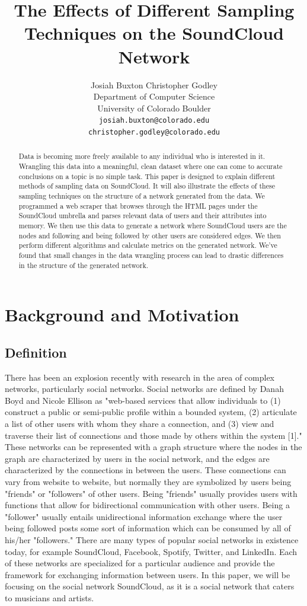 \documentclass{article}
\title{The Effects of Different Sampling Techniques on the SoundCloud Network}
\author{
	Josiah Buxton \hspace{45pt} Christopher Godley\\
	Department of Computer Science\\
	University of Colorado Boulder\\
	\texttt{josiah.buxton@colorado.edu} \\
	\texttt{christopher.godley@colorado.edu} \\
}
\begin{document}
	
\graphicspath{ {c:/users/jbuxofplenty/Github/soundcloud_crawler/final_report/} }

\maketitle

\begin{abstract}
  Data is becoming more freely available to any individual who is interested in it.  Wrangling this data into a meaningful, clean dataset where one can come to accurate conclusions on a topic is no simple task.  This paper is designed to explain different methods of sampling data on SoundCloud.  It will also illustrate the effects of these sampling techniques on the structure of a network generated from the data.  We programmed a web scraper that browses through the HTML pages under the SoundCloud umbrella and parses relevant data of users and their attributes into memory.  We then use this data to generate a network where SoundCloud users are the nodes and following and being followed by other users are considered edges.  We then perform different algorithms and calculate metrics on the generated network.  We've found that small changes in the data wrangling process can lead to drastic differences in the structure of the generated network.
\end{abstract}

\section{Background and Motivation}
\subsection{Definition}
There has been an explosion recently with research in the area of complex networks, particularly social networks.  Social networks are defined by Danah Boyd and Nicole Ellison as "web-based services that allow individuals to (1) construct a public or semi-public profile within a bounded system, (2) articulate a list of other users with whom they share a connection, and (3) view and traverse their list of connections and those made by others within the system [1]."  These networks can be represented with a graph structure where the nodes in the graph are characterized by users in the social network, and the edges are characterized by the connections in between the users.  These connections can vary from website to website, but normally they are symbolized by users being "friends" or "followers" of other users.  Being "friends" usually provides users with functions that allow for bidirectional communication with other users.  Being a "follower" usually entails unidirectional information exchange where the user being followed posts some sort of information which can be consumed by all of his/her "followers."  There are many types of popular social networks in existence today, for example SoundCloud, Facebook, Spotify, Twitter, and LinkedIn.  Each of these networks are specialized for a particular audience and provide the framework for exchanging information between users.  In this paper, we will be focusing on the social network SoundCloud, as it is a social network that caters to musicians and artists.
\end{document}
